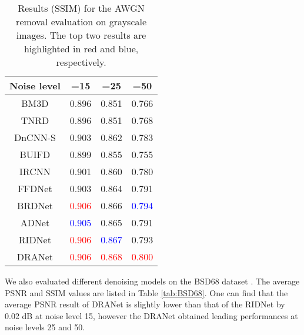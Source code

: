 \documentclass[3p,times]{elsarticle}
\begin{document}
\begin{table}[htbp]
\centering
\caption{Results (SSIM) for the AWGN removal evaluation on grayscale images. The top two results are highlighted in red and blue, respectively.}
\label{tab:Set12_SSIM}
\begin{tabular}{cccc}
\hline
Noise level & =15 & =25 & =50 \\
\hline
BM3D \cite{Dabov2007} & 0.896 & 0.851 & 0.766\\
\hline
TNRD \cite{Chen2017} & 0.896 &  0.851 & 0.768 \\
\hline
DnCNN-S \cite{Zhang2017} & 0.903 & 0.862 & 0.783 \\
\hline
BUIFD \cite{Helou2020} &  0.899 & 0.855 & 0.755 \\
\hline
IRCNN  \cite{ZhangZGZ2017} & 0.901 & 0.860 & 0.780 \\
\hline
FFDNet \cite{Zhang2018} & 0.903 & 0.864 & 0.791 \\
\hline
BRDNet \cite{Tian2020} & \textcolor{red}{0.906} & 0.866 & \textcolor{blue}{0.794} \\
\hline
ADNet \cite{TianX2020} & \textcolor{blue}{0.905} & 0.865 & 0.791 \\
\hline
RIDNet \cite{Anwar2019} & \textcolor{red}{0.906} & \textcolor{blue}{0.867} & 0.793 \\
\hline
DRANet & \textcolor{red}{0.906} & \textcolor{red}{0.868} & \textcolor{red}{0.800} \\
\hline
\end{tabular}
\end{table}

We also evaluated different denoising models on the BSD68 dataset \cite{Roth2005}. The average PSNR and SSIM values are listed in Table \ref{tab:BSD68}. One can find that the average PSNR result of DRANet is slightly lower than that of the RIDNet by 0.02 dB at noise level 15, however the DRANet obtained leading performances at noise levels 25 and 50.
\end{document}
